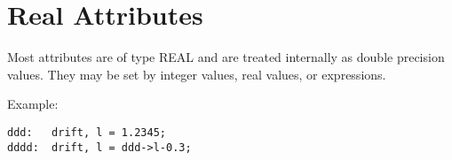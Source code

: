 
\section{Real Attributes}

Most attributes are of type REAL and are treated internally as double
precision values. They may be set by integer values, real values,  or
expressions. 

Example:  
\begin{verbatim}
ddd:   drift, l = 1.2345;
dddd:  drift, l = ddd->l-0.3;
\end{verbatim}


